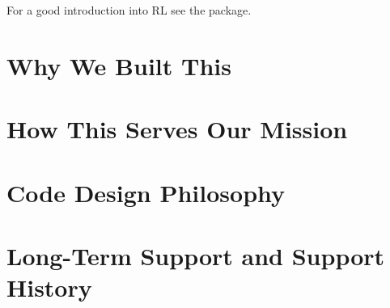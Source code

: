 \documentclass[letterpaper,10pt,english]{sphinxmanual}
\begin{document}
For a good introduction into RL see the  package.


\section{Why We Built This}
\label{\detokenize{user/introduction:why-we-built-this}}

\section{How This Serves Our Mission}
\label{\detokenize{user/introduction:how-this-serves-our-mission}}

\section{Code Design Philosophy}
\label{\detokenize{user/introduction:code-design-philosophy}}

\section{Long-Term Support and Support History}
\label{\detokenize{user/introduction:long-term-support-and-support-history}}
\end{document}

